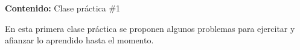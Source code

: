{\Large
    \textbf{Contenido:} Clase práctica \#1
}

En esta primera clase práctica se proponen algunos problemas para ejercitar y afianzar lo aprendido hasta el momento.
